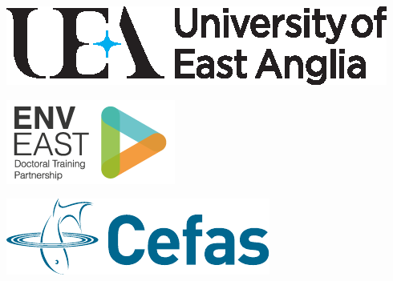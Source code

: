 \documentclass[paper=a4, fontsize=12pt, numbers=endperiod]{scrartcl}
\begin{document}
\begin{center}
\begin{minipage}{0.2\linewidth}
    \includegraphics[width=\linewidth]{uealogo_horizontal.eps}
\end{minipage}
\hspace{2cm}
\begin{minipage}{0.2\linewidth}
    \includegraphics[width=\linewidth]{enveast_logo.png}
\end{minipage}
\hspace{2cm}
\begin{minipage}{0.2\linewidth}
    \includegraphics[width=\linewidth]{cefas_logo.pdf}
\end{minipage}
\end{center}
\end{document}
